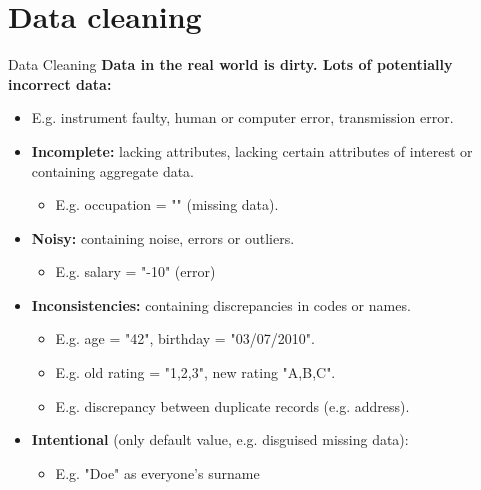 \section{Data cleaning}

\begin{frame}{Data Cleaning}
	\textbf{Data in the real world is {\color{airforceblue}dirty}. Lots of 
	potentially incorrect data:}
	\begin{itemize}
		\item E.g. instrument faulty, human or computer error, transmission 
		error.
		\item \textbf{\color{airforceblue}Incomplete:} lacking attributes, 
		lacking certain attributes of interest or containing aggregate data.
		\begin{itemize}
			\item E.g. occupation = "" (missing data).
		\end{itemize}
		\item \textbf{\color{airforceblue}Noisy:} containing noise, errors or 
		outliers.
		\begin{itemize}
			\item E.g. salary = "-10" (error)
		\end{itemize}
		\item \textbf{\color{airforceblue}Inconsistencies:} containing 
		discrepancies in codes or names.
		\begin{itemize}
			\item E.g. age = "42", birthday = "03/07/2010".
			\item E.g. old rating = "1,2,3", new rating "A,B,C".
			\item E.g. discrepancy between duplicate records (e.g. address).
		\end{itemize}
		\item \textbf{\color{airforceblue}Intentional} (only default value, 
		e.g. disguised missing data):
		\begin{itemize}
			\item E.g. "Doe" as everyone's surname
		\end{itemize}
	\end{itemize}
\end{frame}


